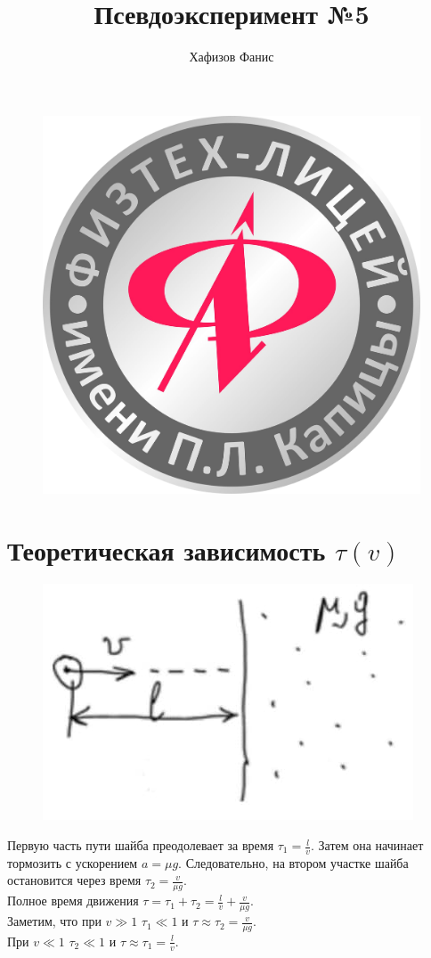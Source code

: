 \documentclass[12pt]{article}
\title{Псевдоэксперимент №5}
\author{Хафизов Фанис}
\begin{document}
	\begin{figure}
		\centering
		\includegraphics[width=0.3\linewidth]{logo}
	\end{figure}
	\maketitle
	\newpage
	\section{Теоретическая зависимость $\tau(v)$}
	\begin{figure}[H]
		\centering
		\includegraphics[width=0.5\linewidth]{scheme}
	\end{figure}
	Первую часть пути шайба преодолевает за время $\displaystyle\tau_1=\frac{l}{v}$. Затем она начинает тормозить с ускорением $a = \mu g$. Следовательно, на втором участке шайба остановится через время $\displaystyle\tau_2=\frac{v}{\mu g}$.\\
	Полное время движения $\displaystyle\tau = \tau_1 + \tau_2 = \frac{l}{v} + \frac{v}{\mu g}$.\\
	Заметим, что при $v \gg 1$ $\tau_1\ll 1$ и $\displaystyle\tau \approx \tau_2 = \frac{v}{\mu g}$.\\
	При $v \ll 1$ $\tau_2 \ll 1$ и $\displaystyle\tau \approx \tau_1 = \frac{l}{v}$.
\end{document}
